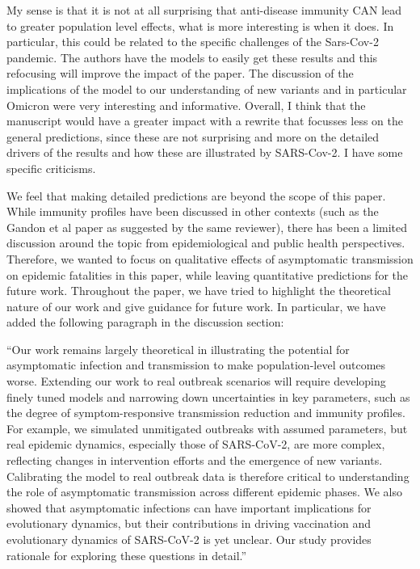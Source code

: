 \documentclass[12pt]{article}
\newcommand{\revtext}{\textsf}
\begin{document}
\revtext{My sense is that it is not at all surprising that anti-disease immunity CAN lead to greater population level effects, what is more interesting is when it does. In particular, this could be related to the specific challenges of the Sars-Cov-2 pandemic. The authors have the models to easily get these results and this refocusing will improve the impact of the paper. The discussion of the implications of the model to our understanding of new variants and in particular Omicron were very interesting and informative. Overall, I think that the manuscript would have a greater impact with a rewrite that focusses less on the general predictions, since these are not surprising and more on the detailed drivers of the results and how these are illustrated by SARS-Cov-2. I have some specific criticisms.}

We feel that making detailed predictions are beyond the scope of this paper. 
While immunity profiles have been discussed in other contexts (such as the Gandon et al paper as suggested by the same reviewer), there has been a limited discussion around the topic from epidemiological and public health perspectives.
Therefore, we wanted to focus on qualitative effects of asymptomatic transmission on epidemic fatalities in this paper, while leaving quantitative predictions for the future work.
Throughout the paper, we have tried to highlight the theoretical nature of our work and give guidance for future work.
In particular, we have added the following paragraph in the discussion section:

``Our work remains largely theoretical in illustrating the potential for asymptomatic infection and transmission to make population-level outcomes worse.
Extending our work to real outbreak scenarios will require developing finely tuned models and narrowing down uncertainties in key parameters, such as the degree of symptom-responsive transmission reduction and immunity profiles.
For example, we simulated unmitigated outbreaks with assumed parameters, but real epidemic dynamics, especially those of SARS-CoV-2, are more complex, reflecting changes in intervention efforts and the emergence of new variants.
Calibrating the model to real outbreak data is therefore critical to understanding the role of asymptomatic transmission across different epidemic phases.
We also showed that asymptomatic infections can have important implications for evolutionary dynamics, but their contributions in driving vaccination and evolutionary dynamics of SARS-CoV-2 is yet unclear.
Our study provides rationale for exploring these questions in detail.''
\end{document}
